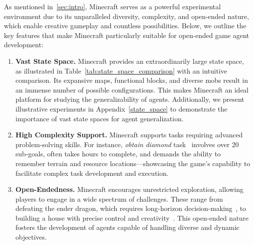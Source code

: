 As mentioned in~\cref{sec:intro}, Minecraft serves as a powerful experimental environment due to its unparalleled diversity, complexity, and open-ended nature, which enable creative gameplay and countless possibilities. Below, we outline the key features that make Minecraft particularly suitable for open-ended game agent development: 

\begin{enumerate}
    \item \textbf{Vast State Space.} Minecraft provides an extraordinarily large state space, as illustrated in Table~\ref{tab:state_space_comparison} with an intuitive comparison. Its expansive maps, functional blocks, and diverse mobs result in an immense number of possible configurations. This makes Minecraft an ideal platform for studying the generalizability of agents. Additionally, we present illustrative experiments in Appendix~\ref{state_space} to demonstrate the importance of vast state spaces for agent generalization.

    \item \textbf{High Complexity Support.} Minecraft supports tasks requiring advanced problem-solving skills. For instance, \emph{obtain diamond} task~\citep{guss2019neurips} involves over 20 sub-goals, often takes hours to complete, and demands the ability to remember terrain and resource locations—showcasing the game's capability to facilitate complex task development and execution.

    \item \textbf{Open-Endedness.} Minecraft encourages unrestricted exploration, allowing players to engage in a wide spectrum of challenges. These range from defeating the ender dragon, which requires long-horizon decision-making~\citep{jin2023mini}, to building a house with precise control and creativity~\citep{zhang2020high}. This open-ended nature fosters the development of agents capable of handling diverse and dynamic objectives.
\end{enumerate}



